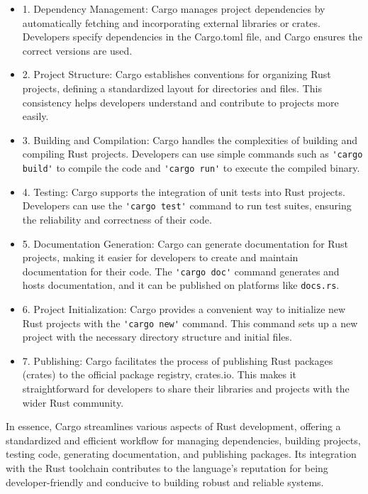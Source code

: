 \begin{itemize}
    \item 1. Dependency Management: Cargo manages project dependencies by automatically fetching and incorporating external libraries or crates. Developers specify 
        dependencies in the Cargo.toml file, and Cargo ensures the correct versions are used.
    \item 2. Project Structure: Cargo establishes conventions for organizing Rust projects, defining a standardized layout for directories and files. This consistency 
        helps developers understand and contribute to projects more easily.
    \item 3. Building and Compilation: Cargo handles the complexities of building and compiling Rust projects. Developers can use simple commands such as \verb+'cargo build'+ to 
        compile the code and \verb+'cargo run'+ to execute the compiled binary.
    \item 4. Testing: Cargo supports the integration of unit tests into Rust projects. Developers can use the \verb+'cargo test'+ command to run test suites, ensuring the 
        reliability and correctness of their code.
    \item 5. Documentation Generation: Cargo can generate documentation for Rust projects, making it easier for developers to create and maintain documentation for their 
        code. The \verb+'cargo doc'+ command generates and hosts documentation, and it can be published on platforms like \verb+docs.rs+.
    \item 6. Project Initialization: Cargo provides a convenient way to initialize new Rust projects with the \verb+'cargo new'+ command. This command sets up a new project with 
        the necessary directory structure and initial files.
    \item 7. Publishing: Cargo facilitates the process of publishing Rust packages (crates) to the official package registry, crates.io. This makes it straightforward for 
        developers to share their libraries and projects with the wider Rust community.
\end{itemize}

In essence, Cargo streamlines various aspects of Rust development, offering a standardized and efficient workflow for managing dependencies, building projects, testing 
code, generating documentation, and publishing packages. Its integration with the Rust toolchain contributes to the language's reputation for being developer-friendly and 
conducive to building robust and reliable systems.

